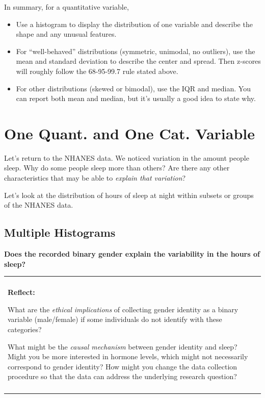 \documentclass[
]{book}
\providecommand{\tightlist}{%
  \setlength{\itemsep}{0pt}\setlength{\parskip}{0pt}}
\newenvironment{reflect}
{
    \begin{center}
    
    \begin{tabular}{|p{0.8\textwidth}|}
    \rowcolor{LightBlue}
    \hline\\
    \rowcolor{LightBlue}
    \textbf{Reflect:}
}
{
    \\\rowcolor{LightBlue}
    \\\hline
    \end{tabular} 
    \end{center}
}
\begin{document}
In summary, for a quantitative variable,

\begin{itemize}
\tightlist
\item
  Use a histogram to display the distribution of one variable and describe the shape and any unusual features.
\item
  For ``well-behaved'' distributions (symmetric, unimodal, no outliers), use the mean and standard deviation to describe the center and spread. Then z-scores will roughly follow the 68-95-99.7 rule stated above.
\item
  For other distributions (skewed or bimodal), use the IQR and median. You can report both mean and median, but it's usually a good idea to state why.
\end{itemize}

\hypertarget{one-quant.-and-one-cat.-variable}{%
\section{One Quant. and One Cat. Variable}\label{one-quant.-and-one-cat.-variable}}

Let's return to the NHANES data. We noticed variation in the amount people sleep. Why do some people sleep more than others? Are there any other characteristics that may be able to \emph{explain that variation}?

Let's look at the distribution of hours of sleep at night within subsets or groups of the NHANES data.

\hypertarget{multiple-histograms}{%
\subsection{Multiple Histograms}\label{multiple-histograms}}

\textbf{Does the recorded binary gender explain the variability in the hours of sleep?}

\begin{reflect}
What are the \emph{ethical implications} of collecting gender identity
as a binary variable (male/female) if some individuals do not identify
with these categories?

What might be the \emph{causal mechanism} between gender identity and
sleep? Might you be more interested in hormone levels, which might not
necessarily correspond to gender identity? How might you change the data
collection procedure so that the data can address the underlying
research question?
\end{reflect}
\end{document}
